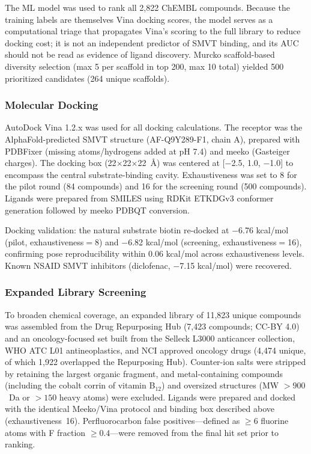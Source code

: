 \documentclass[10pt,letterpaper]{article}
\begin{document}
The ML model was used to rank all 2,822 ChEMBL compounds. Because the training labels are themselves Vina docking scores, the model serves as a computational triage that propagates Vina's scoring to the full library to reduce docking cost; it is not an independent predictor of SMVT binding, and its AUC should not be read as evidence of ligand discovery. Murcko scaffold-based diversity selection (max 5 per scaffold in top 200, max 10 total) yielded 500 prioritized candidates (264 unique scaffolds).

\subsubsection*{Molecular Docking}
AutoDock Vina 1.2.x was used for all docking calculations. The receptor was the AlphaFold-predicted SMVT structure (AF-Q9Y289-F1, chain A), prepared with PDBFixer (missing atoms/hydrogens added at pH 7.4) and meeko (Gasteiger charges). The docking box (22$\times$22$\times$22~\AA{}) was centered at [$-$2.5, 1.0, $-$1.0] to encompass the central substrate-binding cavity. Exhaustiveness was set to 8 for the pilot round (84 compounds) and 16 for the screening round (500 compounds). Ligands were prepared from SMILES using RDKit ETKDGv3 conformer generation followed by meeko PDBQT conversion.

Docking validation: the natural substrate biotin re-docked at $-$6.76 kcal/mol (pilot, exhaustiveness$=$8) and $-$6.82 kcal/mol (screening, exhaustiveness$=$16), confirming pose reproducibility within 0.06 kcal/mol across exhaustiveness levels. Known NSAID SMVT inhibitors (diclofenac, $-$7.15 kcal/mol) were recovered.

\subsubsection*{Expanded Library Screening}
To broaden chemical coverage, an expanded library of 11,823 unique compounds was assembled from the Drug Repurposing Hub (7,423 compounds; CC-BY 4.0) and an oncology-focused set built from the Selleck L3000 anticancer collection, WHO ATC L01 antineoplastics, and NCI approved oncology drugs (4,474 unique, of which 1,922 overlapped the Repurposing Hub). Counter-ion salts were stripped by retaining the largest organic fragment, and metal-containing compounds (including the cobalt corrin of vitamin B$_{12}$) and oversized structures (MW $> 900$~Da or $>150$ heavy atoms) were excluded. Ligands were prepared and docked with the identical Meeko/Vina protocol and binding box described above (exhaustiveness~16). Perfluorocarbon false positives---defined as $\geq 6$ fluorine atoms with F fraction $\geq 0.4$---were removed from the final hit set prior to ranking.
\end{document}
